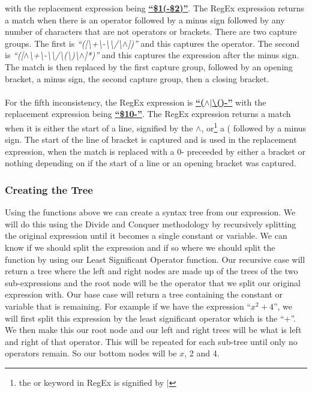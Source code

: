 \documentclass[../../../../../main.tex]{subfiles}
\begin{document}
with the replacement expression being \textbf{\underline{``\$1(-\$2)''}}. The RegEx expression returns a match when there is an operator followed by a minus sign followed by any number of characters that are not operators or brackets. There are two capture groups. The first is \textit{``([\textbackslash+\textbackslash-\textbackslash*\textbackslash/\textbackslash$\wedge$])''} and this captures the operator. The second is \textit{``([$\wedge$\textbackslash+\textbackslash-\textbackslash*\textbackslash/\textbackslash(\textbackslash)\textbackslash$\wedge$]*)''} and this captures the expression after the minus sign. The match is then replaced by the first capture group, followed by an opening bracket, a minus sign, the second capture group, then a closing bracket.\\ \\
For the fifth inconsistency, the RegEx expression is
\textbf{\underline{``($\wedge$$|$\textbackslash()-''}}
with the replacement expression being \textbf{\underline{``\$10-''}}. The RegEx expression returns a match when it is either the start of a line, signified by the $\wedge$, or\footnote{the or keyword in RegEx is signified by $|$} a ( followed by a minus sign. The start of the line of bracket is captured and is used in the replacement expression, when the match is replaced with a 0- preceeded by either a bracket or nothing depending on if the start of a line or an opening bracket was captured.
\newpage
\subsubsection{Creating the Tree}
Using the functions above we can create a syntax tree from our expression. We will do this using the Divide and Conquer methodology by recursively splitting the original expression until it becomes a single constant or variable. We can know if we should split the expression and if so where we should split the function by using our Least Significant Operator function. Our recursive case will return a tree where the left and right nodes are made up of the trees of the two sub-expressions and the root node will be the operator that we split our original expression with. Our base case will return a tree containing the constant or variable that is remaining. For example if we have the expression ``$x^2 + 4$'', we will first split this expression by the least significant operator which is the ``$+$''. We then make this our root node and our left and right trees will be what is left and right of that operator. This will be repeated for each sub-tree until only no operators remain. So our bottom nodes will be $x$, 2 and 4.
\end{document}
